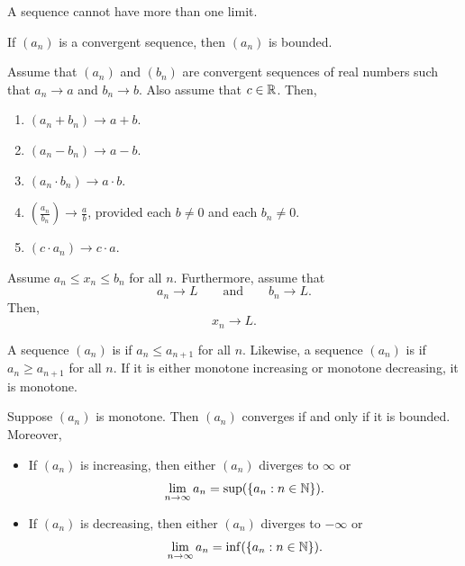 \documentclass[11pt,twoside=off,numbers=noenddot]{scrbook}
\begin{document}
\begin{proposition}
    A sequence cannot have more than one limit.
\end{proposition}

\begin{proposition}
    If $(a_n)$ is a convergent sequence, then $(a_n)$ is bounded.
\end{proposition}

\begin{theorem}
    Assume that $(a_n)$ and $(b_n)$ are convergent sequences of real numbers such that $a_n \to a$ and $b_n \to b$. Also assume that $c \in \mathbb R$. Then,
    \begin{enumerate}
        \item $(a_n + b_n) \to a + b$.
        \item $(a_n - b_n) \to a - b$.
        \item $(a_n \cdot b_n) \to a \cdot b$.
        \item $(\frac{a_n}{b_n}) \to \frac{a}{b}$, provided each $b \neq 0$ and each $b_n \neq 0$.
        \item $(c \cdot a_n) \to c \cdot a$.
    \end{enumerate}
\end{theorem}

\begin{theorem}
    Assume $a_n \leq x_n \leq b_n$ for all $n$. Furthermore, assume that
    \[ a_n \to L \qquad \text{and} \qquad b_n \to L. \]
    Then,
    \[ x_n \to L. \]
\end{theorem}

\begin{definition}
    A sequence $(a_n)$ is  if $a_n \leq a_{n + 1}$ for all $n$. Likewise, a sequence $(a_n)$ is  if $a_n \geq a_{n + 1}$ for all $n$. If it is either monotone increasing or monotone decreasing, it is monotone.
\end{definition}

\begin{theorem}
    Suppose $(a_n)$ is monotone. Then $(a_n)$ converges if and only if it is bounded. Moreover,
    \begin{itemize}
        \item If $(a_n)$ is increasing, then either $(a_n)$ diverges to $\infty$ or
        \[ \lim_{n \to \infty} a_n = \sup(\{ a_n : n \in \mathbb N \}). \]
        \item If $(a_n)$ is decreasing, then either $(a_n)$ diverges to $-\infty$ or
        \[ \lim_{n \to \infty} a_n = \inf(\{ a_n : n \in \mathbb N \}). \]
    \end{itemize}
\end{theorem}
\end{document}

